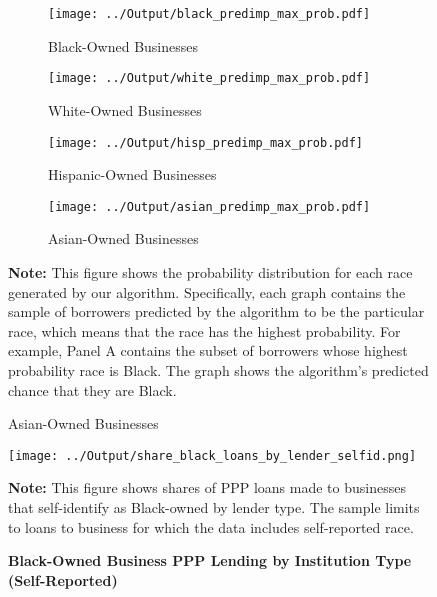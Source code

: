 \documentclass[11pt]{article}
\begin{document}
\newpage
\begin{figure}[H]
	\caption{\textbf{Race Probability Distributions}} \label{f:race_dist}

	\begin{adjustbox}{width=1.05\linewidth, center}
		\begin{subfigure}{0.5\linewidth}
			\caption{Black-Owned Businesses}
			\centering
			\texttt{[image: ../Output/black\_predimp\_max\_prob.pdf]}
		\end{subfigure}
		\begin{subfigure}{0.5\linewidth}
			\caption{White-Owned Businesses}
			\centering
			\texttt{[image: ../Output/white\_predimp\_max\_prob.pdf]}
		\end{subfigure}
	\end{adjustbox}
	\vspace{0.5cm}

	\begin{adjustbox}{width=1.05\linewidth, center}
		\begin{subfigure}{0.5\linewidth}
			\caption{Hispanic-Owned Businesses}
			\centering
			\texttt{[image: ../Output/hisp\_predimp\_max\_prob.pdf]}
		\end{subfigure}
		\begin{subfigure}{0.5\linewidth}
			\caption{Asian-Owned Businesses}
			\centering
			\texttt{[image: ../Output/asian\_predimp\_max\_prob.pdf]}
		\end{subfigure}
	\end{adjustbox}

	\begin{minipage}{\textwidth} \medskip
		\footnotesize{{\bf Note: }This figure shows the probability distribution for each race generated by our algorithm. Specifically, each graph contains the sample of borrowers predicted by the algorithm to be the particular race, which means that the race has the highest probability. For example, Panel A contains the subset of borrowers whose highest probability race is Black. The graph shows the algorithm's predicted chance that they are Black.}
	\end{minipage}
\end{figure}

\newpage
\begin{figure}[H]
	\caption{\textbf{Black-Owned Business PPP Lending by Institution Type (Self-Reported)}}\label{f:bl_self}
	\centering
	\texttt{[image: ../Output/share\_black\_loans\_by\_lender\_selfid.png]}

	\begin{minipage}{\textwidth} \medskip
		\footnotesize{{\bf Note: } This figure shows shares of PPP loans made to businesses that self-identify as Black-owned by lender type. The sample limits to loans to business for which the data includes self-reported race.}
	\end{minipage}
\end{figure}
\end{document}
